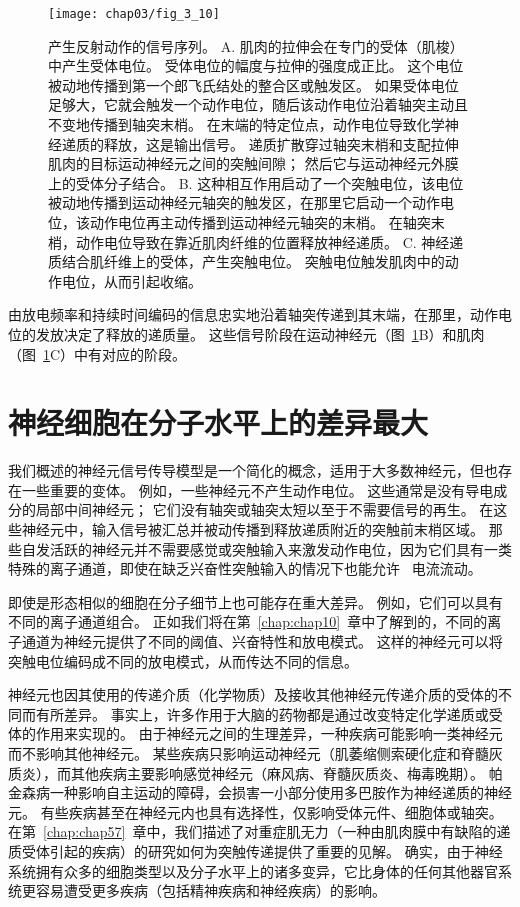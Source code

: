 \begin{figure}[htbp]
	\centering
	\texttt{[image: chap03/fig\_3\_10]}
	\caption{产生反射动作的信号序列。
		A. 肌肉的拉伸会在专门的受体（肌梭）中产生受体电位。 
		受体电位的幅度与拉伸的强度成正比。 
		这个电位被动地传播到第一个郎飞氏结处的整合区或触发区。
		如果受体电位足够大，它就会触发一个动作电位，随后该动作电位沿着轴突主动且不变地传播到轴突末梢。
		在末端的特定位点，动作电位导致化学神经递质的释放，这是输出信号。
		递质扩散穿过轴突末梢和支配拉伸肌肉的目标运动神经元之间的突触间隙；
		然后它与运动神经元外膜上的受体分子结合。
		B. 这种相互作用启动了一个突触电位，该电位被动地传播到运动神经元轴突的触发区，在那里它启动一个动作电位，该动作电位再主动传播到运动神经元轴突的末梢。
		在轴突末梢，动作电位导致在靠近肌肉纤维的位置释放神经递质。
		C. 神经递质结合肌纤维上的受体，产生突触电位。
		突触电位触发肌肉中的动作电位，从而引起收缩。}
	\label{fig:3_10}
\end{figure}


由放电频率和持续时间编码的信息忠实地沿着轴突传递到其末端，在那里，动作电位的发放决定了释放的递质量。 
这些信号阶段在运动神经元（图~\ref{fig:3_10}B）和肌肉（图~\ref{fig:3_10}C）中有对应的阶段。


\section{神经细胞在分子水平上的差异最大}
我们概述的神经元信号传导模型是一个简化的概念，适用于大多数神经元，但也存在一些重要的变体。
例如，一些神经元不产生动作电位。 
这些通常是没有导电成分的局部中间神经元； 它们没有轴突或轴突太短以至于不需要信号的再生。 
在这些神经元中，输入信号被汇总并被动传播到释放递质附近的突触前末梢区域。 
那些自发活跃的神经元并不需要感觉或突触输入来激发动作电位，因为它们具有一类特殊的离子通道，即使在缺乏兴奋性突触输入的情况下也能允许~ 电流流动。


即使是形态相似的细胞在分子细节上也可能存在重大差异。
例如，它们可以具有不同的离子通道组合。
正如我们将在第~\ref{chap:chap10}~章中了解到的，不同的离子通道为神经元提供了不同的阈值、兴奋特性和放电模式。
这样的神经元可以将突触电位编码成不同的放电模式，从而传达不同的信息。


神经元也因其使用的传递介质（化学物质）及接收其他神经元传递介质的受体的不同而有所差异。
事实上，许多作用于大脑的药物都是通过改变特定化学递质或受体的作用来实现的。 
由于神经元之间的生理差异，一种疾病可能影响一类神经元而不影响其他神经元。 
某些疾病只影响运动神经元（肌萎缩侧索硬化症和脊髓灰质炎），而其他疾病主要影响感觉神经元（麻风病、脊髓灰质炎、梅毒晚期）。
帕金森病一种影响自主运动的障碍，会损害一小部分使用多巴胺作为神经递质的神经元。 
有些疾病甚至在神经元内也具有选择性，仅影响受体元件、细胞体或轴突。
在第~\ref{chap:chap57}~章中，我们描述了对重症肌无力（一种由肌肉膜中有缺陷的递质受体引起的疾病）的研究如何为突触传递提供了重要的见解。
确实，由于神经系统拥有众多的细胞类型以及分子水平上的诸多变异，它比身体的任何其他器官系统更容易遭受更多疾病（包括精神疾病和神经疾病）的影响。


